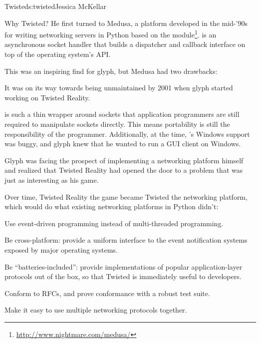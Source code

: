 \begin{aosachapter}{Twisted}{s:twisted}{Jessica McKellar}
\begin{aosasect1}{Why Twisted?}
He first turned to Medusa, a platform developed in the mid-'90s for
writing networking servers in Python based on the 
module\footnote{\url{http://www.nightmare.com/medusa/}}. 
is an asynchronous socket handler that builds a dispatcher and
callback interface on top of the operating system's  API.

This was an inspiring find for glyph, but Medusa had two drawbacks:

\begin{aosaenumerate}

\item It was on its way towards being unmaintained by 2001 when glyph
  started working on Twisted Reality.

\item {} is such a thin wrapper around sockets that
  application programmers are still required to manipulate sockets
  directly. This means portability is still the responsibility of the
  programmer. Additionally, at the time, 's Windows
  support was buggy, and glyph knew that he wanted to run a GUI client
  on Windows.

\end{aosaenumerate}

Glyph was facing the prospect of implementing a networking platform himself
and realized that Twisted Reality had opened the door to a problem that was just
as interesting as his game.

Over time, Twisted Reality the game became Twisted the networking platform,
which would do what existing networking platforms in Python didn't:

\begin{aosaitemize}

\item Use event-driven programming instead of multi-threaded
  programming.

\item Be cross-platform: provide a uniform interface to the event
  notification systems exposed by major operating systems.

\item Be ``batteries-included'': provide implementations of popular
  application-layer protocols out of the box, so that Twisted is
  immediately useful to developers.

\item Conform to RFCs, and prove conformance with a robust test suite.

\item Make it easy to use multiple networking protocols together.


\end{aosaitemize}
\end{aosasect1}
\end{aosachapter}
